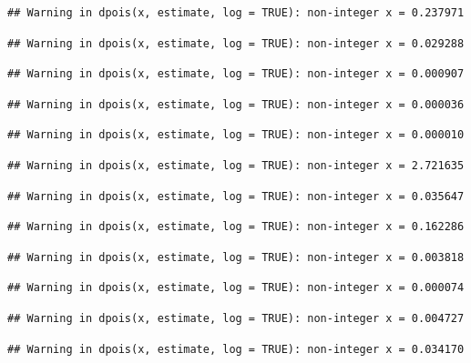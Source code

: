 \documentclass[]{article}
\begin{document}
\begin{verbatim}
## Warning in dpois(x, estimate, log = TRUE): non-integer x = 0.237971
\end{verbatim}

\begin{verbatim}
## Warning in dpois(x, estimate, log = TRUE): non-integer x = 0.029288
\end{verbatim}

\begin{verbatim}
## Warning in dpois(x, estimate, log = TRUE): non-integer x = 0.000907
\end{verbatim}

\begin{verbatim}
## Warning in dpois(x, estimate, log = TRUE): non-integer x = 0.000036
\end{verbatim}

\begin{verbatim}
## Warning in dpois(x, estimate, log = TRUE): non-integer x = 0.000010
\end{verbatim}

\begin{verbatim}
## Warning in dpois(x, estimate, log = TRUE): non-integer x = 2.721635
\end{verbatim}

\begin{verbatim}
## Warning in dpois(x, estimate, log = TRUE): non-integer x = 0.035647
\end{verbatim}

\begin{verbatim}
## Warning in dpois(x, estimate, log = TRUE): non-integer x = 0.162286
\end{verbatim}

\begin{verbatim}
## Warning in dpois(x, estimate, log = TRUE): non-integer x = 0.003818
\end{verbatim}

\begin{verbatim}
## Warning in dpois(x, estimate, log = TRUE): non-integer x = 0.000074
\end{verbatim}

\begin{verbatim}
## Warning in dpois(x, estimate, log = TRUE): non-integer x = 0.004727
\end{verbatim}

\begin{verbatim}
## Warning in dpois(x, estimate, log = TRUE): non-integer x = 0.034170
\end{verbatim}
\end{document}
